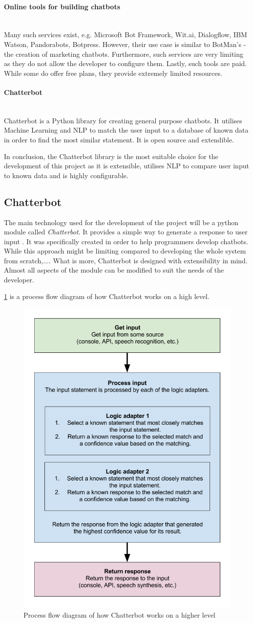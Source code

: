 \documentclass[12pt,a4paper]{article}
\newcommand{\myparagraph}[1]{\paragraph{#1}\mbox{}\\}
\newcommand{\captionstyle}[1] {
    \small{#1}
}
\begin{document}
\myparagraph{Online tools for building chatbots}
Many such services exist, e.g. Microsoft Bot Framework, Wit.ai, Dialogflow, IBM Watson, Pandorabots, Botpress. However, their use case is similar to BotMan's - the creation of marketing chatbots. Furthermore, such services are very limiting as they do not allow the developer to configure them. Lastly, such tools are paid. While some do offer free plans, they provide extremely limited resources.

\myparagraph{Chatterbot}
Chatterbot is a Python library for creating general purpose chatbots. It utilises Machine Learning and NLP to match the user input to a database of known data in order to find the most similar statement. It is open source and extendible. 

In conclusion, the Chatterbot library is the most suitable choice for the development of this project as it is extensible, utilises NLP to compare user input to known data and is highly configurable.

\subsection{Chatterbot}
The main technology used for the development of the project will be a python module called \textit{Chatterbot}. It provides a simple way to generate a response to user input \cite{Chatterbot:online}. It was specifically created in order to help programmers develop chatbots. While this approach might be limiting compared to developing the whole system from scratch,.... What is more, Chatterbot is designed with extensibility in mind. Almost all aspects of the module can be modified to suit the needs of the developer.

\cref{fig:chatterbot-process-flow} is a process flow diagram of how Chatterbot works on a high level.

\begin{figure}[!htb]%
    \centering
    \includegraphics[width=0.6\columnwidth]{chatterbot-process-flow}%
    \caption{\captionstyle{Process flow diagram of how Chatterbot works on a higher level \cite{Chatterbot:online}}}%
    \label{fig:chatterbot-process-flow}%
\end{figure}
\end{document}

